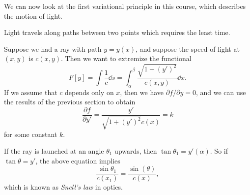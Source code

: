 \documentclass[a4paper]{scrartcl}
\begin{document}
We can now look at the first variational principle in this course, which describes the motion of light.

\begin{law}
Light travels along paths between two points which requires the least time.
\end{law}

Suppose we had a ray with path $y = y(x)$, and suppose the speed of light at $(x, y)$ is $c(x, y)$. Then we want to extremize the functional
$$
F[y] = \int \frac{1}{c} \dd s = \int_{\alpha}^{\beta} \frac{\sqrt{1 + (y')^2}}{c(x, y)} \dd x.
$$
If we assume that $c$ depends only on $x$, then we have $\partial f /\partial y = 0$, and we can use the results of the previous section to obtain
$$
\frac{\partial f}{\partial y'} = \frac{y'}{\sqrt{1 + (y')^2} c(x)} = k
$$
for some constant $k$.

If the ray is launched at an angle $\theta_1$ upwards, then $\tan \theta_1 = y'(\alpha)$. So if $\tan \theta = y'$, the above equation implies
$$
\frac{\sin \theta_1}{c(x_1)} = \frac{\sin(\theta)}{c(x)},
$$
which is known as \emph{Snell's law} in optics.
\end{document}
